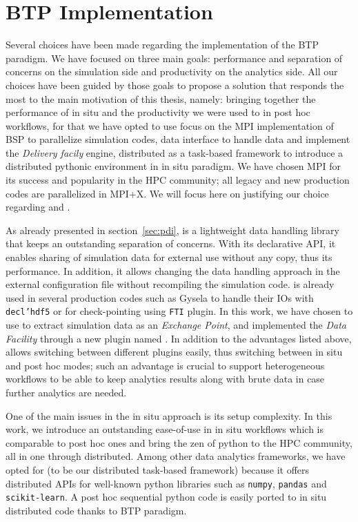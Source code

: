 \section{BTP Implementation}\label{sec:btpimplementation}
Several choices have been made regarding the implementation of the BTP paradigm. We have focused on three main goals: performance and separation of concerns on the simulation side and productivity on the analytics side. All our choices have been guided by those goals to propose a solution that responds the most to the main motivation of this thesis, namely: bringing together the performance of in situ and the productivity we were used to in post hoc workflows, for that we have opted to use focus on the MPI implementation of BSP to parallelize simulation codes, \pdi data interface to handle data and implement the \textit{Delivery facily} engine, \dask distributed as a task-based framework to introduce a distributed pythonic environment in in situ paradigm. 
We have chosen MPI for its success and popularity in the HPC community; all legacy and new production codes are parallelized in MPI+X. We will focus here on justifying our choice regarding \pdi and \dask.

As already presented in section~\ref{sec:pdi}, \pdi is a lightweight data handling library that keeps an outstanding separation of concerns. With its declarative API, it enables sharing of simulation data for external use without any copy, thus its performance. In addition, it allows changing the data handling approach in the external configuration file without recompiling the simulation code. \pdi is already used in several production codes such as Gysela\cite{bigot:hal-01050322-gysela, latu:hal-01834323-gysela, latu:hal-01719208-gysela} to handle their IOs with \texttt{decl'hdf5} or for check-pointing using \texttt{FTI} plugin.      
In this work, we have chosen to use \pdi to extract simulation data as an \textit{Exchange Point}, and implemented the \textit{Data Facility} through a new \pdi plugin named \deisa. In addition to the advantages listed above, \pdi allows switching between different plugins easily, thus switching between in situ and post hoc modes; such an advantage is crucial to support heterogeneous workflows to be able to keep analytics results along with brute data in case further analytics are needed. 

One of the main issues in the in situ approach is its setup complexity. In this work, we introduce an outstanding ease-of-use in in situ workflows which is comparable to post hoc ones and bring the zen of python to the HPC community, all in one through \dask distributed. Among other data analytics frameworks, we have opted for \dask (to be our distributed task-based framework) because it offers distributed APIs for well-known python libraries such as \texttt{numpy}, \texttt{pandas} and \texttt{scikit-learn}. A post hoc sequential python code is easily ported to in situ distributed \dask code thanks to BTP paradigm.     


